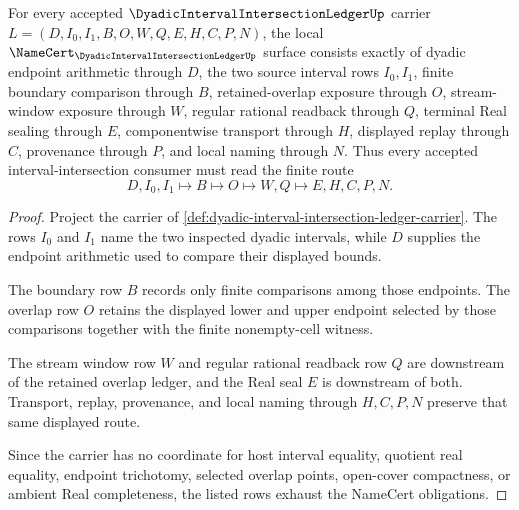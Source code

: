 \begin{theorem}
\label{thm:dyadic-interval-intersection-ledger-namecert-obligations}
For every accepted $\DyadicIntervalIntersectionLedgerUp$ carrier $L=(D,I_0,I_1,B,O,W,Q,E,H,C,P,N)$, the local $\NameCert_{\DyadicIntervalIntersectionLedgerUp}$ surface consists exactly of dyadic endpoint arithmetic through $D$, the two source interval rows $I_0,I_1$, finite boundary comparison through $B$, retained-overlap exposure through $O$, stream-window exposure through $W$, regular rational readback through $Q$, terminal Real sealing through $E$, componentwise transport through $H$, displayed replay through $C$, provenance through $P$, and local naming through $N$. Thus every accepted interval-intersection consumer must read the finite route
$$
D,I_0,I_1 \longmapsto B \longmapsto O \longmapsto W,Q \longmapsto E,H,C,P,N .
$$
\end{theorem}
\begin{proof}
Project the carrier of \autoref{def:dyadic-interval-intersection-ledger-carrier}. The rows $I_0$ and $I_1$ name the two inspected dyadic intervals, while $D$ supplies the endpoint arithmetic used to compare their displayed bounds.

The boundary row $B$ records only finite comparisons among those endpoints. The overlap row $O$ retains the displayed lower and upper endpoint selected by those comparisons together with the finite nonempty-cell witness.

The stream window row $W$ and regular rational readback row $Q$ are downstream of the retained overlap ledger, and the Real seal $E$ is downstream of both. Transport, replay, provenance, and local naming through $H,C,P,N$ preserve that same displayed route.

Since the carrier has no coordinate for host interval equality, quotient real equality, endpoint trichotomy, selected overlap points, open-cover compactness, or ambient Real completeness, the listed rows exhaust the NameCert obligations.
\end{proof}

